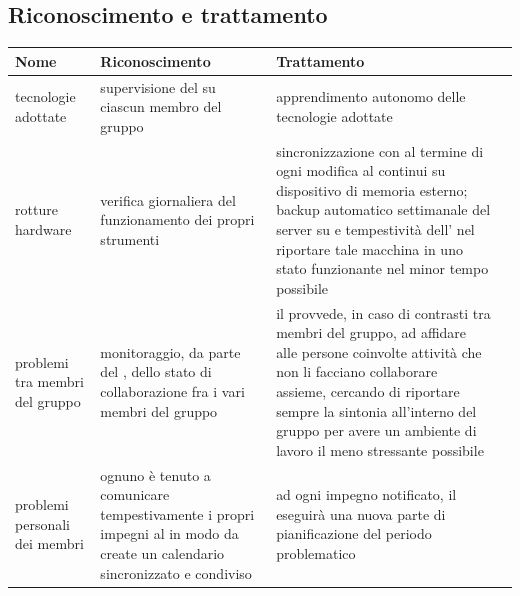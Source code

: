 \newpage
\subsection{Riconoscimento e trattamento}

\begin{adjustwidth}{-3cm}{-3cm}
\begin{center}
\begin{tabular}{| p{3cm} | p{3.5cm} | p{4cm} | p{3cm} |}
	\hline
	\textbf{Nome} & \textbf{Riconoscimento} & \textbf{Trattamento} \\
	\hline
	tecnologie adottate & supervisione del \Rx{} su ciascun membro del gruppo & apprendimento autonomo delle tecnologie adottate \\
	rotture hardware & verifica giornaliera del funzionamento dei propri strumenti & sincronizzazione con \gloss{GitHub} al termine di ogni modifica al \gloss{repository} continui \gloss{backup} su dispositivo di memoria esterno; backup automatico settimanale del server su \gloss{AWS} e tempestività dell’\AM{} nel riportare tale macchina in uno stato funzionante nel minor tempo possibile \\
	problemi tra membri del gruppo & monitoraggio, da parte del \Rx{}, dello stato di collaborazione fra i vari membri del gruppo & il \Rx{} provvede, in caso di contrasti tra membri del gruppo, ad affidare alle persone coinvolte attività che non li facciano collaborare assieme, cercando di riportare sempre la sintonia all'interno del gruppo per avere un ambiente di lavoro il meno stressante possibile \\
	problemi personali dei membri & ognuno è tenuto a comunicare tempestivamente i propri impegni al \Rx{} in modo da create un calendario sincronizzato e condiviso & ad ogni impegno notificato, il \Rx{} eseguirà una nuova parte di pianificazione del periodo problematico \\
	
	
	
\end{tabular}
\end{center}
\end{adjustwidth}

